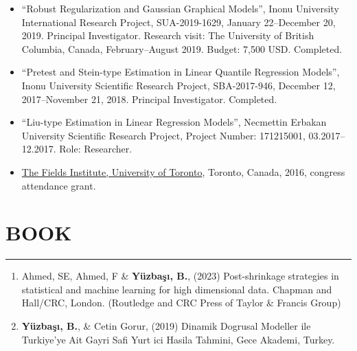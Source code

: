 \documentclass[10pt,letterpaper]{article}
\newcommand{\NewPart}[2]{%
	\Needspace{7\baselineskip}%
	\vspace{0.45em}%
	\section*{\sffamily\large\bfseries\color{MidnightBlue}\uppercase{#1} #2}%
	\vspace{-0.7em}\noindent\color{MidnightBlue}\rule{\textwidth}{0.55pt}\color{Black}\vspace{0.25em}}
\newenvironment{etaremune}{\begin{enumerate}}{\end{enumerate}}
\begin{document}
\begin{itemize}
\item ``Robust Regularization and Gaussian Graphical Models'', Inonu University International Research Project, SUA-2019-1629, January 22--December 20, 2019. Principal Investigator. Research visit: The University of British Columbia, Canada, February--August 2019. Budget: 7,500 USD. Completed.
 
\item ``Pretest and Stein-type Estimation in Linear Quantile Regression Models'', Inonu University Scientific Research Project, SBA-2017-946, December 12, 2017--November 21, 2018. Principal Investigator. Completed.

\item ``Liu-type Estimation in Linear Regression Models'', Necmettin Erbakan University Scientific Research Project, Project Number: 171215001, 03.2017--12.2017. Role: Researcher.


\item \href{http://www.fields.utoronto.ca}{The Fields Institute, University of Toronto}, Toronto, Canada, 2016, congress attendance grant.



\end{itemize}


\NewPart{Book}{}
\begin{etaremune}
\renewcommand{\theenumi}{B\arabic{enumi}}

\item Ahmed, SE, Ahmed, F \& {\bf Y\"{u}zba\c{s}{\i}, B.}, (2023) Post-shrinkage strategies in statistical and machine learning for high dimensional data. Chapman and Hall/CRC, London. (Routledge and CRC Press of Taylor \& Francis Group)



\item {\bf Y\"{u}zba\c{s}{\i}, B.},  \& Cetin Gorur, (2019) Dinamik Dogrusal Modeller ile Turkiye'ye Ait Gayri Safi Yurt ici Hasila Tahmini, Gece Akademi, Turkey.

\end{etaremune}
\end{document}
